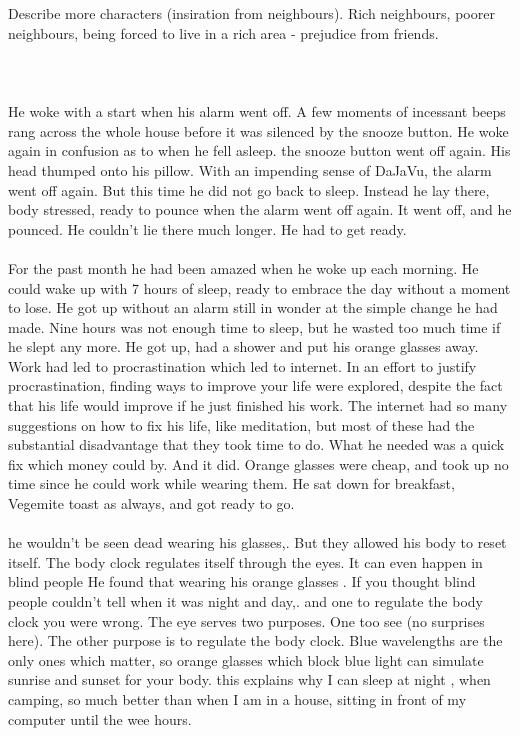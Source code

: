 \documentclass[12pt, a4paper]{book}
\begin{document}
\chapter{}
Describe more characters (insiration from neighbours). Rich neighbours, poorer neighbours, being forced to live in a rich area - prejudice from friends.
\\\\

\chapter{}
He woke with a start when his alarm went off. A few moments of incessant beeps rang across the whole house before it was silenced by the snooze button. He woke again in confusion as to when he fell asleep. the snooze button went off again. His head thumped onto his pillow. With an impending sense of DaJaVu, the alarm went off again. But this time he did not go back to sleep. Instead he lay there, body stressed, ready to pounce when the alarm went off again. It went off, and he pounced. He couldn't lie there much longer. He had to get ready.
\\\\
For the past month he had been amazed when he woke up each morning. He could wake up with 7 hours of sleep, ready to embrace the day without a moment to lose. He got up without an alarm still in wonder at the simple change he had made. Nine hours was not enough time to sleep, but he wasted too much time if he slept any more. He got up, had a shower and put his orange glasses away. Work had led to procrastination which led to internet. In an effort to justify procrastination, finding ways to improve your life were explored, despite the fact that his life would improve if he just finished his work. The internet had so many suggestions on how to fix his life, like meditation, but most of these had the substantial disadvantage that they took time to do. What he needed was a quick fix which money could by. And it did. Orange glasses were cheap, and took up no time since he could work while wearing them. He sat down for breakfast, Vegemite toast as always, and got ready to go.
\\\\
he wouldn't be seen dead wearing his glasses,. But they allowed his body to reset itself. The body clock regulates itself  through the eyes. It can even happen in blind people
He found that wearing his orange glasses . If you thought blind people couldn't tell when it was night and day,. and one to regulate the body clock you were wrong. The eye serves two purposes. One too see (no surprises here). The other purpose is to regulate the body clock. Blue wavelengths are the only ones which matter, so orange glasses which block blue light can simulate sunrise and sunset for your body. this explains why I can sleep at night , when camping, so much better than when I am in a house, sitting in front of my computer until the wee hours.
\end{document}
